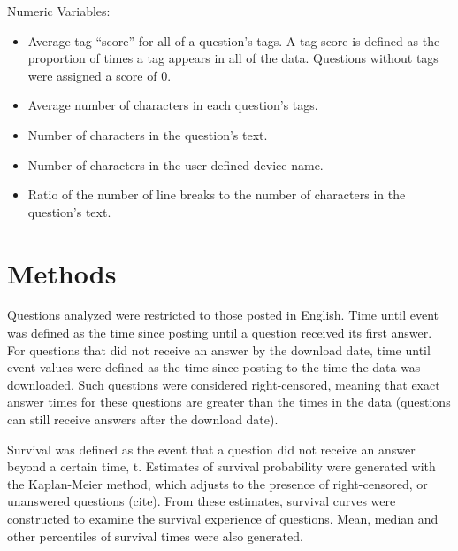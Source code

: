 \documentclass{article}
\begin{document}
Numeric Variables:

\begin{itemize}
  \item Average tag ``score'' for all of a question's tags. A tag score is defined as the proportion of times a tag appears in all of the data. Questions without tags were assigned a score of 0. 
  \item Average number of characters in each question's tags. 
  \item Number of characters in the question's text. 
  \item Number of characters in the user-defined device name. 
  \item Ratio of the number of line breaks to the number of characters in the question's text.
\end{itemize}


\section*{Methods}

Questions analyzed were restricted to those posted in English. Time until event was defined as the time since posting until a question received its first answer. For questions that did not receive an answer by the download date, time until event values were defined as the time since posting to the time the data was downloaded. Such questions were considered right-censored, meaning that exact answer times for these questions are greater than the times in the data (questions can still receive answers after the download date). 

Survival was defined as the event that a question did not receive an answer beyond a certain time, t. Estimates of survival probability were generated with the Kaplan-Meier method, which adjusts to the presence of right-censored, or unanswered questions (cite). From these estimates, survival curves were constructed to examine the survival experience of questions. Mean, median and other percentiles of survival times were also generated. 
\end{document}
